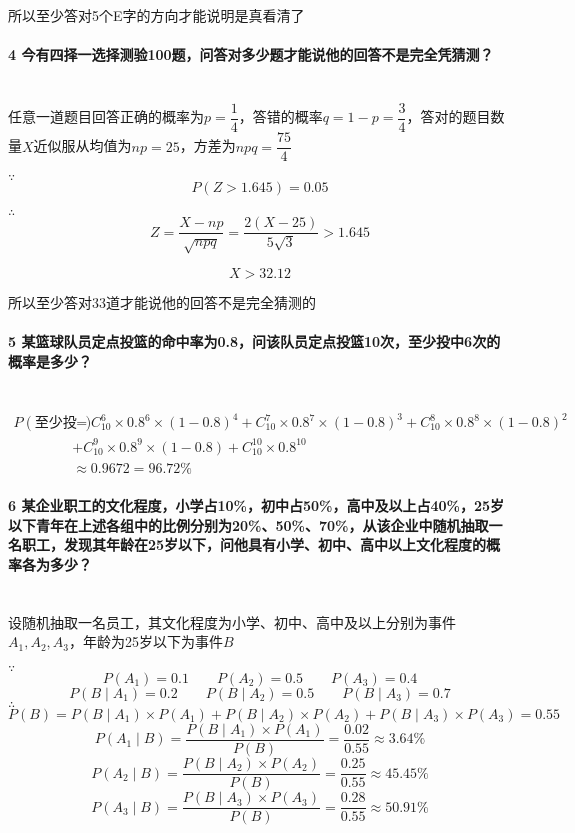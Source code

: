 \documentclass[UTF8]{ctexart}
\begin{document}
所以至少答对5个E字的方向才能说明是真看清了


\paragraph{4 今有四择一选择测验100题，问答对多少题才能说他的回答不是完全凭猜测？}
~\\

任意一道题目回答正确的概率为$ p=\dfrac{1}{4} $，答错的概率$ q=1-p=\dfrac{3}{4} $，答对的题目数量$ X $近似服从均值为$ np=25 $，方差为$ npq=\dfrac{75}{4} $

$\because $
$$P(Z>1.645)=0.05$$

$ \therefore $
$$Z=\dfrac{X-np}{\sqrt{npq}}=\dfrac{2(X-25)}{5\sqrt{3}}>1.645$$

$$X>32.12$$

所以至少答对33道才能说他的回答不是完全猜测的

\paragraph{5 某篮球队员定点投篮的命中率为0.8，问该队员定点投篮10次，至少投中6次的概率是多少？}
~\\
$$
 \begin{aligned}
P(\mbox{至少投中6次})
 &=C_{10}^6\times 0.8^6 \times (1-0.8)^4+C_{10}^7\times 0.8^7 \times (1-0.8)^3+C_{10}^8\times 0.8^8 \times (1-0.8)^2\\
 &+C_{10}^9\times 0.8^9 \times (1-0.8)+C_{10}^10\times 0.8^{10}\\
 &\approx0.9672=96.72\%
\end{aligned}
$$

\paragraph{6 某企业职工的文化程度，小学占10\%，初中占50\%，高中及以上占40\%，25岁以下青年在上述各组中的比例分别为20\%、50\%、70\%，从该企业中随机抽取一名职工，发现其年龄在25岁以下，问他具有小学、初中、高中以上文化程度的概率各为多少？}
~\\

设随机抽取一名员工，其文化程度为小学、初中、高中及以上分别为事件$A_1, A_2, A_3$，年龄为25岁以下为事件$B$

$\because$
$$P(A_1)=0.1 \qquad P(A_2)=0.5 \qquad P(A_3)=0.4 $$
$$P(B\mid A_1)=0.2 \qquad P(B\mid A_2)=0.5 \qquad P(B\mid A_3)=0.7 $$
$ \therefore $
$$P(B)=P(B\mid A_1)\times P(A_1)+ P(B\mid A_2)\times P(A_2)+ P(B\mid A_3)\times P(A_3)=0.55 $$
$$P(A_1 \mid B)=\dfrac{P(B\mid A_1)\times P(A_1)}{P(B)}=\dfrac{0.02}{0.55}\approx3.64\% $$
$$P(A_2 \mid B)=\dfrac{P(B\mid A_2)\times P(A_2)}{P(B)}=\dfrac{0.25}{0.55}\approx45.45\%$$
$$P(A_3 \mid B)=\dfrac{P(B\mid A_3)\times P(A_3)}{P(B)}=\dfrac{0.28}{0.55}\approx50.91\%$$
\end{document}
